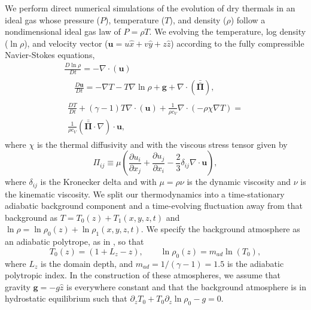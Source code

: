 \documentclass[twocolumn, amsmath, amsfonts, amssymb, trackchanges]{aastex62}
\newcommand{\Div}[1]{\ensuremath{\nabla\cdot\left( #1\right)}}
\newcommand{\grad}{\ensuremath{\nabla}}
\newcommand{\stressT}{\ensuremath{\bm{\bar{\bar{\Pi}}}}}
\begin{document}
We perform direct numerical simulations of the evolution of dry thermals
in an ideal gas whose pressure ($P$), temperature ($T$), and density ($\rho$)
follow a nondimensional ideal gas law of $P = \rho T$.
We evolving the temperature, log density ($\ln\rho$), and velocity vector
($\bm{u} = u\hat{x} + v\hat{y} + z\hat{z}$) according to the fully compressible Navier-Stokes equations,
\begin{gather}
\frac{D \ln\rho}{Dt} = -\Div{\bm{u}}
	\label{eqn:continuity}
\\
\begin{align}
&\frac{D \bm{u}}{D t} =
-\grad T - T \grad\ln\rho + \bm{g} + \Div{\stressT}, 
\end{align}
	\label{eqn:full_momentum}
\\
\begin{align}
\frac{D T}{D t} + (\gamma - 1)T\Div{\bm{u}} + \frac{1}{\rho c_V}\Div{-\rho\chi\grad T} =\\
\frac{1}{\rho c_V}(\stressT \cdot \grad)\cdot \bm{u}, \nonumber
\end{align}
	\label{eqn:full_energy}
\end{gather}
where $\chi$ is the thermal diffusivity and with the viscous stress tensor given by
\begin{equation}
\Pi_{ij} \equiv \mu\left(\frac{\partial u_i}{\partial x_j} + 
\frac{\partial u_j}{\partial x_i} - \frac{2}{3}\delta_{ij}\grad\cdot\bm{u}\right),
	\label{eqn:stress_tensor}
\end{equation}
where $\delta_{ij}$ is the Kronecker delta and with $\mu = \rho\nu$ is the
dynamic viscosity and $\nu$ is the kinematic viscosity.
We split our thermodynamics into a time-stationary adiabatic background component
and a time-evolving fluctuation away from that background as
$T = T_0(z) + T_1(x, y, z, t)$ and $\ln\rho = \ln\rho_0(z) + \ln\rho_1(x, y, z, t)$.
We specify the background atmosphere as an adiabatic polytrope, as in
\cite{anders&brown2017}, so that
\begin{equation}
T_0(z) = (1 + L_z - z), \qquad \ln\rho_0(z) = m_{ad}\ln(T_0),
\end{equation}
where $L_z$ is the domain depth, and $m_{ad} = 1/(\gamma-1) = 1.5$ is the
adiabatic polytropic index. In the construction of these atmospheres, 
we assume that gravity $\bm{g} = -g\hat{z}$ is everywhere constant and that the
background atmosphere is in hydrostatic equilibrium such that
$\partial_z T_0 + T_0 \partial_z\ln\rho_0 - g = 0$. 
\end{document}
